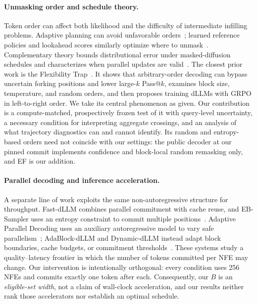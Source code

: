 \documentclass[11pt]{article}
\begin{document}
\paragraph{Unmasking order and schedule theory.}
Token order can affect both likelihood and the difficulty of intermediate infilling problems. Adaptive planning can avoid unfavorable orders~\citep{kim2025ordering}; learned reference policies and lookahead scores similarly optimize where to unmask~\citep{hong2025policies,asano2026where,lee2025lookahead}. Complementary theory bounds distributional error under masked-diffusion schedules and characterizes when parallel updates are valid~\citep{chen2026optimal}. The closest prior work is the Flexibility Trap~\citep{ni2026flexibility}. It shows that arbitrary-order decoding can bypass uncertain forking positions and lower large-$k$ Pass@$k$, examines block size, temperature, and random orders, and then proposes training dLLMs with GRPO in left-to-right order. We take its central phenomenon as given. Our contribution is a compute-matched, prospectively frozen test of it with query-level uncertainty, a necessary condition for interpreting aggregate crossings, and an analysis of what trajectory diagnostics can and cannot identify. Its random and entropy-based orders need not coincide with our settings: the public decoder at our pinned commit implements confidence and block-local random remasking only, and EF is our addition.

\paragraph{Parallel decoding and inference acceleration.}
A separate line of work exploits the same non-autoregressive structure for throughput. Fast-dLLM combines parallel commitment with cache reuse, and EB-Sampler uses an entropy constraint to commit multiple positions~\citep{wu2026fastdllm,benhamu2025ebsampler}. Adaptive Parallel Decoding uses an auxiliary autoregressive model to vary safe parallelism~\citep{israel2025apd}; AdaBlock-dLLM and Dynamic-dLLM instead adapt block boundaries, cache budgets, or commitment thresholds~\citep{lu2026adablock,wu2026dynamic}. These systems study a quality--latency frontier in which the number of tokens committed per NFE may change. Our intervention is intentionally orthogonal: every condition uses 256 NFEs and commits exactly one token after each. Consequently, our $B$ is an \emph{eligible-set width}, not a claim of wall-clock acceleration, and our results neither rank those accelerators nor establish an optimal schedule.
\end{document}
